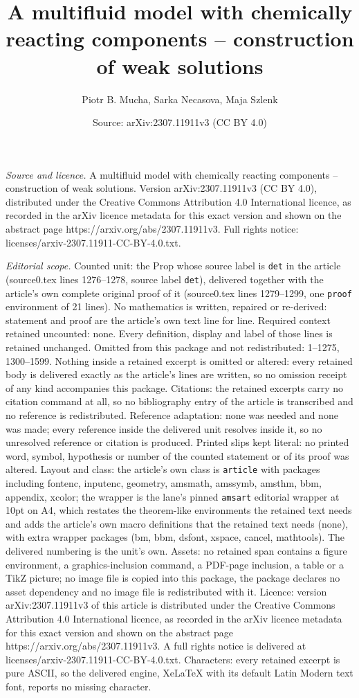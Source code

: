 \documentclass[10pt,a4paper]{amsart}
\title[A multifluid model with chemically reacting components -- co]{A multifluid model with chemically reacting components -- construction of weak solutions}
\author{Piotr B. Mucha, Sarka Necasova, Maja Szlenk}
\date{Source: arXiv:2307.11911v3 (CC BY 4.0)}
\begin{document}
\maketitle

\noindent\emph{Source and licence.} A multifluid model with chemically reacting components -- construction of weak solutions. Version arXiv:2307.11911v3 (CC BY 4.0), distributed under the Creative Commons Attribution 4.0 International licence, as recorded in the arXiv licence metadata for this exact version and shown on the abstract page https://arxiv.org/abs/2307.11911v3. Full rights notice: licenses/arxiv-2307.11911-CC-BY-4.0.txt.\par\smallskip

\noindent\textit{Editorial scope.} Counted unit: the Prop whose source label is \texttt{det} in the article (source0.tex lines 1276--1278, source label \texttt{det}), delivered together with the article's own complete original proof of it (source0.tex lines 1279--1299, one \texttt{proof} environment of 21 lines). No mathematics is written, repaired or re-derived: statement and proof are the article's own text line for line. Required context retained uncounted: none. Every definition, display and label of those lines is retained unchanged. Omitted from this package and not redistributed: 1--1275, 1300--1599. Nothing inside a retained excerpt is omitted or altered: every retained body is delivered exactly as the article's lines are written, so no omission receipt of any kind accompanies this package. Citations: the retained excerpts carry no citation command at all, so no bibliography entry of the article is transcribed and no reference is redistributed. Reference adaptation: none was needed and none was made; every reference inside the delivered unit resolves inside it, so no unresolved reference or citation is produced. Printed slips kept literal: no printed word, symbol, hypothesis or number of the counted statement or of its proof was altered. Layout and class: the article's own class is \texttt{article} with packages including fontenc, inputenc, geometry, amsmath, amssymb, amsthm, bbm, appendix, xcolor; the wrapper is the lane's pinned \texttt{amsart} editorial wrapper at 10pt on A4, which restates the theorem-like environments the retained text needs and adds the article's own macro definitions that the retained text needs (none), with extra wrapper packages (bm, bbm, dsfont, xspace, cancel, mathtools). The delivered numbering is the unit's own. Assets: no retained span contains a figure environment, a graphics-inclusion command, a PDF-page inclusion, a table or a TikZ picture; no image file is copied into this package, the package declares no asset dependency and no image file is redistributed with it. Licence: version arXiv:2307.11911v3 of this article is distributed under the Creative Commons Attribution 4.0 International licence, as recorded in the arXiv licence metadata for this exact version and shown on the abstract page https://arxiv.org/abs/2307.11911v3. A full rights notice is delivered at licenses/arxiv-2307.11911-CC-BY-4.0.txt. Characters: every retained excerpt is pure ASCII, so the delivered engine, XeLaTeX with its default Latin Modern text font, reports no missing character.
\end{document}

